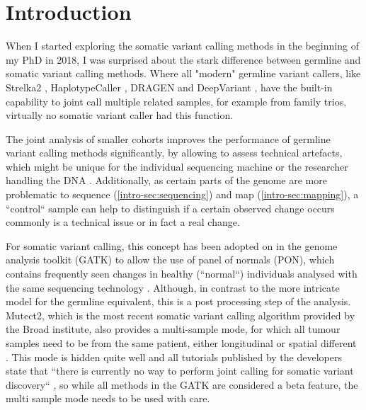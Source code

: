 \section{Introduction}
\label{variantcalling-sec:intro}

When I started exploring the somatic variant calling methods in the beginning of my PhD in 2018, I was surprised about the stark difference between germline and somatic variant calling methods. Where all "modern" germline variant callers, like Strelka2 \cite{Kim2018}, HaplotypeCaller \cite{Poplin2017}, DRAGEN \cite{Miller2015} and DeepVariant \cite{Poplin2018},  have the built-in capability to joint call multiple related samples, for example from family trios, virtually no somatic variant caller had this function. 

The joint analysis of smaller cohorts improves the performance of germline variant calling methods significantly, by allowing to assess technical artefacts, which might be unique for the individual sequencing machine or the researcher handling the DNA \cite{Schirmer2016,Stoler2021}. Additionally, as certain parts of the genome are more problematic to sequence (\autoref{intro-sec:sequencing}) and map (\autoref{intro-sec:mapping}), a ``control`` sample can help to distinguish if a certain observed change occurs commonly is a technical issue or in fact a real change.

For somatic variant calling, this concept has been adopted on in the genome analysis toolkit (GATK) \cite{BrianOConnor2020} to allow the use of panel of normals (PON), which contains frequently seen changes in healthy (``normal``) individuals analysed with the same sequencing technology \cite{GATKTeam2021}. Although, in contrast to the  more intricate model for the germline equivalent, this is a post processing step of the analysis. Mutect2, which is the most recent somatic variant calling algorithm provided by the Broad institute, also provides a multi-sample mode, for which all tumour samples need to be from the same patient, either longitudinal or spatial different \cite{GATKTeam2020}. This mode is hidden quite well and all tutorials published by the developers state that ``there is currently no way to perform joint calling for somatic variant discovery`` \cite{GATKTeam2021a}, so while all methods in the GATK are considered a beta feature, the multi sample mode needs to be used with care.

